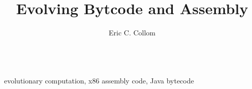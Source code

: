 \documentclass{sig-alternate}
\begin{document}
%

\title{Evolving Bytcode and Assembly}
%
%
%
%
%
%
\author{
%
%
\alignauthor
Eric C. Collom \\
 \\
}

\maketitle
\begin{abstract}

\end{abstract}
evolutionary computation, x86 assembly code, Java bytecode
\end{document}
